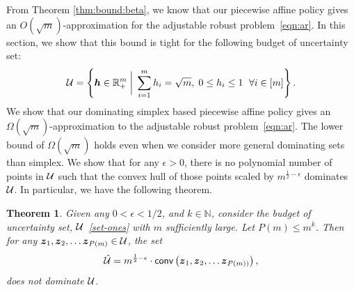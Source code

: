 \documentclass[11pt]{article}
\theoremstyle{plain}
\newtheorem{theorem}{Theorem}[section]
\theoremstyle{definition}
\numberwithin{equation}{section}%
\numberwithin{equation}{section}%
\newcommand{\mb}[1]{\ensuremath{\boldsymbol{#1}}}
\begin{document}
From Theorem \ref{thm:bound:beta}, we know that our piecewise affine policy gives an $O(\sqrt{m})$-approximation for the adjustable robust problem~\eqref{eqn:ar}. In this section, we show that this bound is tight for the following budget of uncertainty set:
\begin{equation}\label{set-ones}
 {\cal U}= \left\{ \mb h \in \mathbb R^{m}_+ \;  \bigg\vert \;     \sum_{i=1}^m h_i= \sqrt{m} , \; 0 \leq h_i \leq 1 \ \;  \forall i \in [m]       \right\}.
\end{equation}
 We show that our dominating simplex based piecewise affine policy gives an $\Omega (\sqrt{m})$-approximation to the adjustable robust problem~\eqref{eqn:ar}. The lower bound of $\Omega (\sqrt{m})$ holds even when we consider more general dominating sets than simplex. We show that for any $ \epsilon > 0 $, there is no polynomial number of points in ${\cal U}$ such that the convex hull of those points scaled by $ m ^{\frac{1}{2}-\epsilon}$  dominates $ {\cal U}$. In particular, we have the following theorem.

\begin{theorem}\label{thm:worstcase}
Given any $0 < \epsilon < 1/2$, and $k \in {\mathbb N}$, consider the budget of uncertainty set, ${\cal U}$~\eqref{set-ones} with $m$ sufficiently large. Let $P(m) \leq m^k$. Then for any $\mb{z}_1,\mb{z}_2,\ldots\mb{z}_{P(m)} \in {\cal U}$,  the set
\[ {\hat{\cal U}}= m^{\frac{1}{2}-\epsilon} \cdot { \sf{conv}} \left( \mb{z}_1,\mb {z}_2,\ldots\mb{z}_{P(m))}\right),\]
does not dominate  ${\cal U}$.
\end{theorem}
\end{document}
